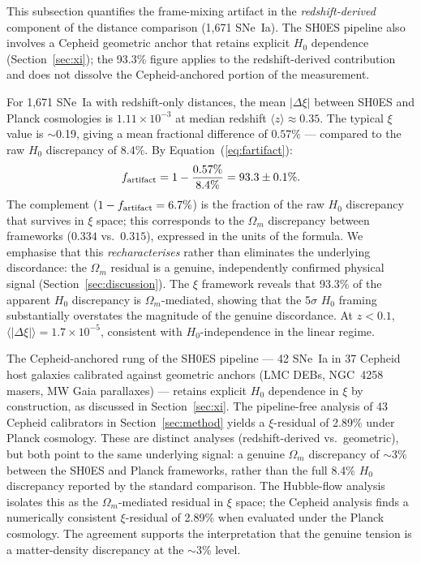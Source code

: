 \documentclass[usenatbib]{mnras}
\begin{document}
This subsection quantifies the frame-mixing artifact in the
\emph{redshift-derived} component of the distance comparison
(1,671 SNe~Ia). The SH0ES pipeline also involves a Cepheid geometric
anchor that retains explicit $H_0$ dependence (Section~\ref{sec:xi});
the 93.3\% figure applies to the redshift-derived contribution and does
not dissolve the Cepheid-anchored portion of the measurement.

For 1,671 SNe~Ia with redshift-only distances, the mean $|\Delta\xi|$
between SH0ES and Planck cosmologies is $1.11 \times 10^{-3}$ at median
redshift $\langle z\rangle \approx 0.35$. The typical $\xi$ value is
$\sim$0.19, giving a mean fractional difference of $0.57\%$ --- compared
to the raw $H_0$ discrepancy of $8.4\%$. By Equation~(\ref{eq:fartifact}):
\begin{equation}
f_{\rm artifact} = 1 - \frac{0.57\%}{8.4\%} = 93.3 \pm 0.1\%.
\end{equation}
The complement ($1 - f_{\rm artifact} = 6.7\%$) is the fraction of the
raw $H_0$ discrepancy that survives in $\xi$ space; this corresponds to
the $\Omega_m$ discrepancy between frameworks ($0.334$ vs.\ $0.315$),
expressed in the units of the formula. We emphasise that this
\emph{recharacterises} rather than eliminates the underlying discordance:
the $\Omega_m$ residual is a genuine, independently confirmed physical
signal (Section~\ref{sec:discussion}). The $\xi$ framework reveals that
93.3\% of the apparent $H_0$ discrepancy is $\Omega_m$-mediated, showing
that the 5$\sigma$ $H_0$ framing substantially overstates the magnitude
of the genuine discordance.
At $z < 0.1$, $\langle|\Delta\xi|\rangle = 1.7 \times 10^{-5}$,
consistent with $H_0$-independence in the linear regime.

The Cepheid-anchored rung of the SH0ES pipeline --- 42 SNe~Ia in
37 Cepheid host galaxies calibrated against geometric anchors (LMC
DEBs, NGC~4258 masers, MW Gaia parallaxes) --- retains explicit
$H_0$ dependence in $\xi$ by construction, as discussed in
Section~\ref{sec:xi}. The pipeline-free analysis of 43 Cepheid
calibrators in Section~\ref{sec:method} yields a $\xi$-residual of
2.89\% under Planck cosmology. These are distinct analyses (redshift-derived vs.\ geometric), but both
point to the same underlying signal: a genuine $\Omega_m$ discrepancy
of $\sim$3\% between the SH0ES and Planck frameworks, rather than the
full 8.4\% $H_0$ discrepancy reported by the standard comparison.
The Hubble-flow analysis isolates this as the $\Omega_m$-mediated
residual in $\xi$ space; the Cepheid analysis finds a numerically
consistent $\xi$-residual of 2.89\% when evaluated under the Planck
cosmology. The agreement supports the interpretation that the genuine
tension is a matter-density discrepancy at the $\sim$3\% level.
\end{document}
